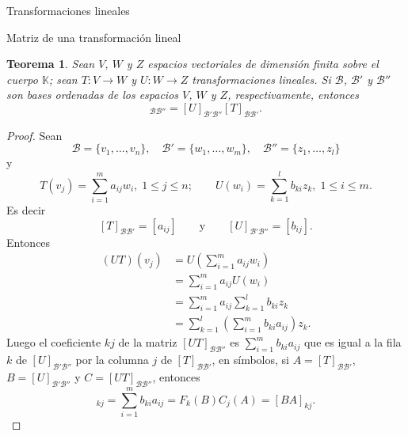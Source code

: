 \documentclass[a4paper,12pt,twoside,spanish,reqno]{amsbook}
\numberwithin{equation}{section}
\newtheorem{teorema}{Teorema}[section]
\theoremstyle{definition}
\theoremstyle{remark}
\newcommand{\K}{\mathbb K}
\begin{document}
\begin{chapter}{Transformaciones lineales}
\begin{section}{Matriz de una transformación lineal}
        \begin{teorema}\label{th-5.5}
            Sean $V$, $W$ y $Z$ espacios vectoriales de dimensión finita sobre el cuerpo $\K$; sean $T: V \to W$ y $U: W \to Z$  transformaciones lineales.  Si $\mathcal B$, $\mathcal B'$ y $\mathcal B''$ son bases ordenadas de los espacios $V$, $W$ y $Z$, respectivamente, entonces
            \begin{equation}
                [UT]_{\mathcal B\mathcal B''} = 	[U]_{\mathcal B'\mathcal B''} 	[T]_{\mathcal B\mathcal B'}.  
            \end{equation} 
        \end{teorema}
        \begin{proof}
            Sean
            \begin{equation*}
                 \mathcal B = \{v_1,\ldots,v_n\},\quad\mathcal B' = \{w_1,\ldots,w_m\},\quad  \mathcal B''= \{z_1,\ldots,z_l\}
            \end{equation*}
            y
            \begin{equation*}
            T(v_j) = \sum_{i=1}^m a_{ij} w_i, \; 1 \le j \le n; \qquad U(w_i) = \sum_{k=1}^l b_{ki} z_k, \; 1 \le i \le m.
            \end{equation*}
            Es decir 
            $$
            [T]_{\mathcal B\mathcal B'} = [a_{ij}]\qquad \text{y} \qquad [U]_{\mathcal B'\mathcal B''} = [b_{ij}]. 
            $$
            Entonces
            \begin{align*}
                (UT)(v_j) &= U(\sum_{i=1}^m a_{ij} w_i) \\
                &=  \sum_{i=1}^m a_{ij} U(w_i) \\
                &=  \sum_{i=1}^m a_{ij} \sum_{k=1}^l b_{ki} z_k \\
                &= \sum_{k=1}^l(\sum_{i=1}^m  b_{ki}a_{ij})  z_k.
            \end{align*}
            Luego el coeficiente $kj$ de la matriz $[UT]_{\mathcal B\mathcal B''}$ es $\sum_{i=1}^m  b_{ki}a_{ij}$ que es igual a la fila $k$ de $[U]_{\mathcal B'\mathcal B''}$ por la columna $j$ de  $[T]_{\mathcal B\mathcal B'}$,  en símbolos,  si $A= 	[T]_{\mathcal B\mathcal B'}$, $B = 	[U]_{\mathcal B'\mathcal B''}$ y $C = 	[UT]_{\mathcal B\mathcal B''}$, entonces
            \begin{equation*}
                [C]_{kj} = \sum_{i=1}^m  b_{ki}a_{ij} = F_k(B)C_j(A) = [BA]_{kj}.
            \end{equation*}
        \end{proof}	
            

\end{section}
\end{chapter}
\end{document}
